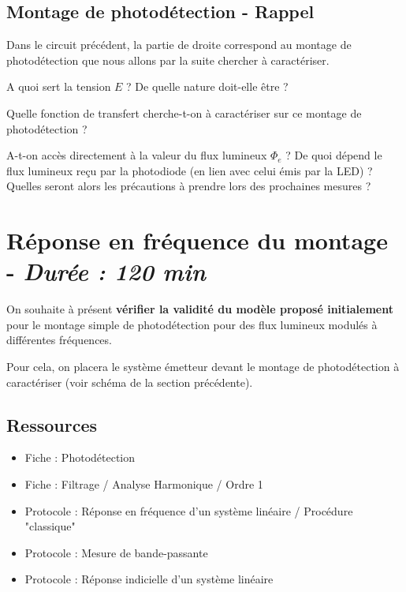 \subsection{Montage de photodétection - Rappel}

Dans le circuit précédent, la partie de droite correspond au montage de photodétection que nous allons par la suite chercher à caractériser.

\Quest A quoi sert la tension $E$ ? De quelle nature doit-elle être ?

\Quest Quelle fonction de transfert cherche-t-on à caractériser sur ce montage de photodétection ? 

\Quest A-t-on accès directement à la valeur du flux lumineux $\Phi_e$ ? De quoi dépend le flux lumineux reçu par la photodiode (en lien avec celui émis par la LED) ? Quelles seront alors les précautions à prendre lors des prochaines mesures ?



\clearpage
\section{Réponse en fréquence du montage - \textit{Durée : 120 min}}

On souhaite à présent \textbf{vérifier la validité du modèle proposé initialement} pour le montage simple de photodétection pour des flux lumineux modulés à différentes fréquences.

Pour cela, on placera le système émetteur devant le montage de photodétection à caractériser (voir schéma de la section précédente).

\subsection{Ressources}

\begin{itemize}
	\item Fiche : Photodétection
	\item Fiche : Filtrage / Analyse Harmonique / Ordre 1
	\item Protocole : Réponse en fréquence d'un système linéaire / Procédure "classique"
	\item Protocole : Mesure de bande-passante
	\item Protocole : Réponse indicielle d'un système linéaire
\end{itemize}



